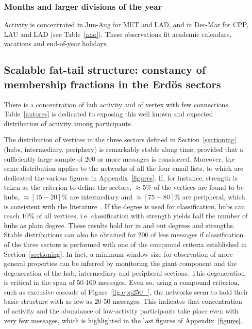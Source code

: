 \documentclass[%
 aip,
 jmp,%
 amsmath,amssymb,
 reprint,%
]{revtex4-1}
\begin{document}
\subsubsection{Months and larger divisions of the year}
 Activity is concentrated in Jun-Aug for MET and LAD, and in Dec-Mar for CPP, LAU and LAD (see Table~\ref{ano}). These observations fit academic calendars, vacations and end-of-year holidays.

\subsection{Scalable fat-tail structure: constancy of membership fractions in the Erd\"os sectors}\label{subsec:pih}
There is a concentration of hub activity and of vertex with few connections. Table~\ref{autores} is dedicated to exposing this well known and expected distribution of activity among participants.

The distribution of vertices in the three sectors defined in Section~\ref{sectioning} (hubs, intermediary, periphery) is remarkably stable along time, provided that a sufficiently large sample of 200 or more messages is considered. Moreover, the same distribution applies to the networks of all the four email lists, to which are dedicated the various figures in Appendix~\ref{figures}. If, for instance, strength is taken as the criterion to define the sectors, $\approx 5\%$ of the vertices are found to be hubs, $\approx [15-20]\%$ are intermediary and $\approx [75-80]\%$ are peripheral, which is consistent with the literature~\cite{secFree}. If the degree is used for classification, hubs can reach $10\%$ of all vertices, i.e. classification with strength yields half the number of hubs as plain degree. These results hold for in and out degrees and strengths. Stable distributions can also be obtained for 200 of less messages if classification of the three sectors is performed with one of the compound criteria established in Section~\ref{sectioning}. In fact, a minimum window size for observation of more general properties can be inferred by monitoring the giant component and the degeneration of the hub, intermediary and peripheral sections. This degeneration is critical in the span of 50-100 messages. Even so, using a compound criterion, such as exclusive cascade of Figure~\ref{fig:cpp250_}, the networks seem to hold their basic structure with as few as 20-50 messages. This indicates that concentration of activity and the abundance of low-activity participants take place even with very few messages, which is highlighted in the last figures of Appendix~\ref{figures}.
\end{document}
